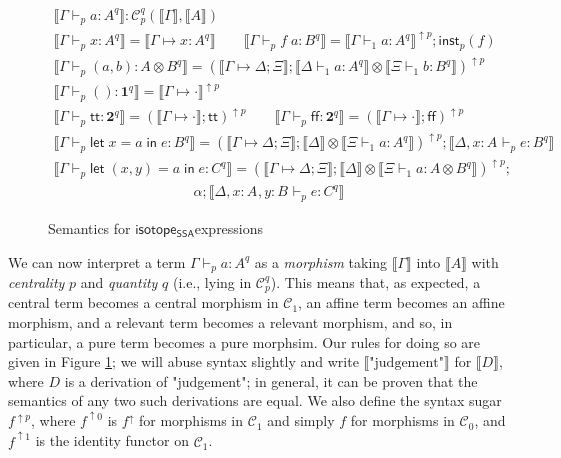 \documentclass[acmsmall,screen,review]{acmart}
\newcommand{\mc}[1]{\ensuremath{\mathcal{#1}}}
\newcommand{\mb}[1]{\ensuremath{\mathbf{#1}}}
\newcommand{\ms}[1]{\ensuremath{\mathsf{#1}}}
\newcommand{\lbl}[1]{{`#1}}
\newcommand{\ctt}{\ms{tt}}
\newcommand{\cff}{\ms{ff}}
\newcommand{\letexpr}[3]{\ensuremath{\ms{let}\;#1 = #2\;\ms{in}\;#3}}
\newcommand{\csplits}[3]{#1 \mapsto #2;#3}
\newcommand{\cwk}[2]{#1 \mapsto #2}
\newcommand{\thyp}[3]{#1: {#2}^{#3}}
\newcommand{\lhyp}[3]{#1[#2](#3)}
\newcommand{\llhyp}[3]{\lhyp{\lbl{#1}}{#2}{#3}}
\newcommand{\hasty}[5]{#1 \vdash_{#2} #3: {#4}^{#5}}
\newcommand{\haslb}[3]{#1 \vdash #2 \rhd #3}
\newcommand{\dnt}[1]{\llbracket{#1}\rrbracket}
\newcommand{\upg}[2]{{#1}^{\uparrow #2}}
\newcommand{\isotopessa}{\ms{isotope_{SSA}}}
\begin{document}
\begin{figure}
  \begin{gather*}
    \boxed{\dnt{\hasty{\Gamma}{p}{a}{A}{q}}
      : \mc{C}_p^q(\dnt{\Gamma}, \dnt{A})} 
      \\
    \dnt{\hasty{\Gamma}{p}{x}{A}{q}} 
      = \dnt{\cwk{\Gamma}{\thyp{x}{A}{q}}}
      \qquad
    \dnt{\hasty{\Gamma}{p}{f\;a}{B}{q}}
      = \upg{\dnt{\hasty{\Gamma}{1}{a}{A}{q}}}{p}
      ; \ms{inst}_p(f) 
      \\
    \dnt{\hasty{\Gamma}{p}{(a, b)}{A \otimes B}{q}}
      = \upg{(
        \dnt{\csplits{\Gamma}{\Delta}{\Xi}};
        \dnt{\hasty{\Delta}{1}{a}{A}{q}} \otimes
        \dnt{\hasty{\Xi}{1}{b}{B}{q}}
      )}{p} 
      \\
    \dnt{\hasty{\Gamma}{p}{()}{\mb{1}}{q}}
      = \upg{\dnt{\cwk{\Gamma}{\cdot}}}{p} 
      \\
    \dnt{\hasty{\Gamma}{p}{\ctt}{\mb{2}}{q}}
      = \upg{(\dnt{\cwk{\Gamma}{\cdot}};\ctt)}{p}
      \qquad
    \dnt{\hasty{\Gamma}{p}{\cff}{\mb{2}}{q}}
      = \upg{(\dnt{\cwk{\Gamma}{\cdot}};\cff)}{p} 
      \\
    \dnt{\hasty{\Gamma}{p}{\letexpr{x}{a}{e}}{B}{q}}
      = \upg{(
        \dnt{\csplits{\Gamma}{\Delta}{\Xi}}
        ; \dnt{\Delta} \otimes \dnt{\hasty{\Xi}{1}{a}{A}{q}}
      )}{p};\dnt{\hasty{\Delta, \thyp{x}{A}{}}{p}{e}{B}{q}} 
      \\
    \dnt{\hasty{\Gamma}{p}{\letexpr{(x, y)}{a}{e}}{C}{q}}
      = \upg{(
        \dnt{\csplits{\Gamma}{\Delta}{\Xi}}
        ; \dnt{\Delta} \otimes \dnt{\hasty{\Xi}{1}{a}{A \otimes B}{q}}
      )}{p}
      ; 
      \\ \qquad \qquad \qquad \qquad \qquad \alpha
      ; \dnt{\hasty{\Delta, \thyp{x}{A}{}, \thyp{y}{B}{}}{p}{e}{C}{q}}
  \end{gather*}
  \caption{Semantics for \isotopessa expressions}
  \label{fig:ssa-term-semantics}
\end{figure}

We can now interpret a term \(\hasty{\Gamma}{p}{a}{A}{q}\) as a
\textit{morphism} taking \(\dnt{\Gamma}\) into \(\dnt{A}\) with
\textit{centrality} \(p\) and \textit{quantity} \(q\) (i.e., lying in
\(\mc{C}_p^q\)). This means that, as expected, a central term becomes a central
morphism in \(\mc{C}_1\), an affine term becomes an affine morphism, and a
relevant term becomes a relevant morphism, and so, in particular, a pure term
becomes a pure morphsim. Our rules for doing so are given in Figure
\ref{fig:ssa-term-semantics}; we will abuse syntax slightly and write
\(\dnt{\text{"judgement"}}\) for \(\dnt{D}\), where \(D\) is a derivation of
"judgement"; in general, it can be proven that the semantics of any two such
derivations are equal. We also define the syntax sugar \(\upg{f}{p}\), where
\(\upg{f}{0}\) is \(\upg{f}{}\) for morphisms in \(\mc{C}_1\) and simply \(f\)
for morphisms in \(\mc{C}_0\), and \(\upg{f}{1}\) is the identity functor on
\(\mc{C}_1\).
\end{document}

